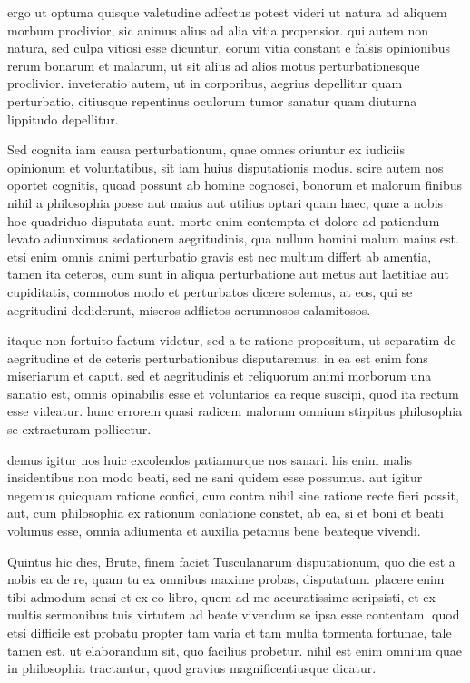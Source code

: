  ergo ut optuma quisque valetudine adfectus potest videri ut natura ad aliquem morbum proclivior, sic animus alius ad alia vitia propensior. qui autem non natura, sed culpa vitiosi esse dicuntur, eorum vitia constant e falsis opinionibus rerum bonarum et malarum, ut sit alius ad alios motus perturbationesque proclivior. inveteratio autem, ut in corporibus, aegrius depellitur quam perturbatio, citiusque repentinus oculorum tumor sanatur quam diuturna lippitudo depellitur.

 Sed cognita iam causa perturbationum, quae omnes oriuntur ex iudiciis opinionum et voluntatibus, sit iam huius disputationis modus. scire autem nos oportet cognitis, quoad possunt ab homine cognosci, bonorum et malorum finibus nihil a philosophia posse aut maius aut utilius optari quam haec, quae a nobis hoc quadriduo disputata sunt. morte enim contempta et dolore ad patiendum levato adiunximus sedationem aegritudinis, qua nullum homini malum maius est. etsi enim omnis animi perturbatio gravis est nec multum differt ab amentia, tamen ita ceteros, cum sunt in aliqua perturbatione aut metus aut laetitiae aut cupiditatis, commotos modo et perturbatos dicere solemus, at eos, qui se aegritudini dediderunt, miseros adflictos aerumnosos calamitosos.

 itaque non fortuito factum videtur, sed a te ratione propositum, ut separatim de aegritudine et de ceteris perturbationibus disputaremus; in ea est enim fons miseriarum et caput. sed et aegritudinis et reliquorum animi morborum una sanatio est, omnis opinabilis esse et voluntarios ea reque suscipi, quod ita rectum esse videatur. hunc errorem quasi radicem malorum omnium stirpitus philosophia se extracturam pollicetur.

 demus igitur nos huic excolendos patiamurque nos sanari. his enim malis insidentibus non modo beati, sed ne sani quidem esse possumus. aut igitur negemus quicquam ratione confici, cum contra nihil sine ratione recte fieri possit, aut, cum philosophia ex rationum conlatione constet, ab ea, si et boni et beati volumus esse, omnia adiumenta et auxilia petamus bene beateque vivendi.

 Quintus hic dies, Brute, finem faciet Tusculanarum disputationum, quo die est a nobis ea de re, quam tu ex omnibus maxime probas, disputatum. placere enim tibi admodum sensi et ex eo libro, quem ad me accuratissime scripsisti, et ex multis sermonibus tuis virtutem ad beate vivendum se ipsa esse contentam. quod etsi difficile est probatu propter tam varia et tam multa tormenta fortunae, tale tamen est, ut elaborandum sit, quo facilius probetur. nihil est enim omnium quae in philosophia tractantur, quod gravius magnificentiusque dicatur.

